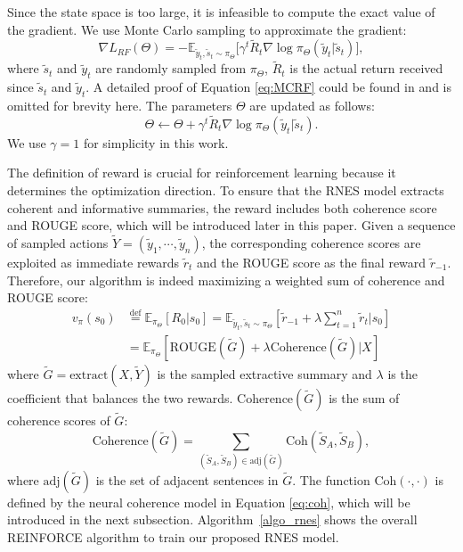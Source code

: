 \documentclass[letterpaper]{article} \usepackage{aaai18}  \usepackage{times}  \usepackage{helvet}  \usepackage{courier}  \usepackage{url}  \usepackage{graphicx}  \usepackage{amssymb}
\begin{document}
	Since the state space is too large, it is infeasible to compute the exact value of the gradient. We use Monte Carlo sampling to approximate the gradient:
\begin{equation} \label{eq:MCRF}
	\nabla L_{RF}(\Theta) = - \mathbb{E}_{\tilde{y}_t, \tilde{s}_t \sim \pi_{\Theta}} \Big[ \gamma^t \tilde{R}_t \nabla \log \pi_{\Theta}(\tilde{y}_t|\tilde{s}_t) \Big] ,
	\end{equation}
	where $\tilde{s}_t$ and $\tilde{y}_t$ are randomly sampled from $\pi_{\Theta}$, $\tilde{R}_t$ is the actual return received since $\tilde{s}_t$ and $\tilde{y}_t$. A detailed proof of Equation \ref{eq:MCRF} could be found in \cite{sutton_reinforcement_nodate} and is omitted for brevity here. The parameters $\Theta$ are updated as follows:
	\begin{equation} \label{eq:update}
	\Theta \leftarrow \Theta + \gamma^t \tilde{R}_t \nabla \log \pi_{\Theta}(\tilde{y}_t|\tilde{s}_t) .
	\end{equation}
	We use $\gamma=1$ for simplicity in this work.
	
	The definition of reward is crucial for reinforcement learning because it determines the optimization direction. To ensure that the RNES model extracts coherent and informative summaries, the reward includes both coherence score and ROUGE score, which will be introduced later in this paper. Given a sequence of sampled actions $\tilde{Y} = (\tilde{y}_1, \cdots, \tilde{y}_n)$, the corresponding coherence scores are exploited as immediate rewards $\tilde{r}_t$ and the ROUGE score as the final reward $\tilde{r}_{-1}$. Therefore, our algorithm is indeed maximizing a weighted sum of coherence and ROUGE score:
	\begin{align}
	v_{\pi}(s_0) &\overset{\text{def}}{=} \mathbb{E}_{\pi_{\Theta}}[R_0 |s_0] = \mathbb{E}_{\tilde{y}_t, \tilde{s}_t \sim \pi_{\Theta}} [ \tilde{r}_{-1} + \lambda \sum_{t=1}^{n} \tilde{r}_t | s_0] \nonumber \\
	&= \mathbb{E}_{\pi_{\Theta}} [ \text{ROUGE}(\tilde{G}) + \lambda \text{Coherence}(\tilde{G}) | X ] \label{eq:reward_sum} 
	\end{align}
	where $\tilde{G} =\text{extract} (X, \tilde{Y})$ is the sampled extractive summary and $\lambda$ is the coefficient that balances the two rewards. $\text{Coherence}(\tilde{G})$ is the sum of coherence scores of $\tilde{G}$:
	\[\text{Coherence}(\tilde{G})= \sum_{(\tilde{S}_A, \tilde{S}_B) \in \text{adj}(\tilde{G})} \text{Coh}(\tilde{S}_A, \tilde{S}_B) ,\]
 	where $\text{adj}(\tilde{G})$ is the set of adjacent sentences in $\tilde{G}$. The function $\text{Coh}(\cdot,\cdot)$ is defined by the neural coherence model in Equation \ref{eq:coh}, which will be introduced in the next subsection. Algorithm~\ref{algo_rnes} shows the overall REINFORCE algorithm to train our proposed RNES model.  
	
\end{document}
